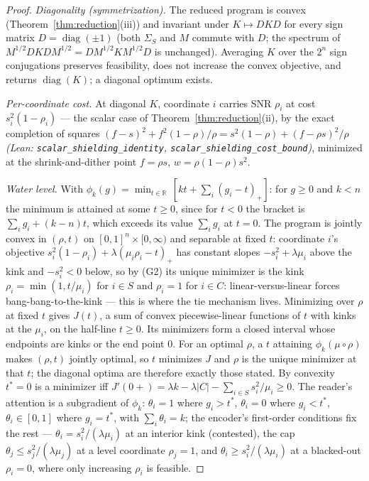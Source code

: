 \documentclass[11pt]{article}
\theoremstyle{definition}
\begin{document}
\begin{proof}
\emph{Diagonality (symmetrization).} The reduced program is convex
(Theorem~\ref{thm:reduction}(iii)) and invariant under $K\mapsto
DKD$ for every sign matrix $D = \operatorname{diag}(\pm1)$ (both
$\Sigma_S$ and $M$ commute with $D$; the spectrum of
$M^{1/2}DKDM^{1/2} = D M^{1/2}KM^{1/2}D$ is unchanged). Averaging
$K$ over the $2^n$ sign conjugations preserves feasibility, does not
increase the convex objective, and returns
$\operatorname{diag}(K)$; a diagonal optimum exists.

\emph{Per-coordinate cost.} At diagonal $K$, coordinate $i$ carries
SNR $\rho_i$ at cost $s_i^2(1-\rho_i)$ --- the scalar case of
Theorem~\ref{thm:reduction}(ii), by the exact completion of squares
$(f-s)^2 + f^2(1-\rho)/\rho = s^2(1-\rho) + (f-\rho s)^2/\rho$
\emph{(Lean: \texttt{scalar\_shielding\_identity},
\texttt{scalar\_shielding\_cost\_bound})}, minimized at the
shrink-and-dither point $f=\rho s$, $w = \rho(1-\rho)s^2$.

\emph{Water level.} With $\phi_k(g) = \min_{t\in\mathbb R}\,[kt +
\sum_i(g_i-t)_+]$: for $g\ge0$ and $k<n$ the minimum is attained at
some $t\ge0$, since for $t<0$ the bracket is $\sum_ig_i+(k-n)t$, which
exceeds its value $\sum_ig_i$ at $t=0$. The program is jointly convex
in $(\rho,t)$ on $[0,1]^n\times[0,\infty)$ and separable at fixed $t$:
coordinate $i$'s objective $s_i^2(1-\rho_i) + \lambda(\mu_i\rho_i -
t)_+$ has constant slopes $-s_i^2 + \lambda\mu_i$ above the kink and
$-s_i^2 < 0$ below, so by (G2) its unique minimizer is the kink
$\rho_i = \min(1, t/\mu_i)$ for $i\in S$ and $\rho_i = 1$ for $i\in C$:
linear-versus-linear forces bang-bang-to-the-kink --- this is where
the tie mechanism lives. Minimizing over $\rho$ at fixed $t$ gives
$J(t)$, a sum of convex piecewise-linear functions of $t$ with kinks at
the $\mu_i$, on the half-line $t\ge0$. Its minimizers form a closed
interval whose endpoints are kinks or the end point $0$. For an optimal
$\rho$, a $t$ attaining $\phi_k(\mu\circ\rho)$ makes $(\rho,t)$ jointly
optimal, so $t$ minimizes $J$ and $\rho$ is the unique minimizer at
that $t$; the diagonal optima are therefore exactly those stated. By
convexity $t^\ast=0$ is a minimizer iff
$J'(0+)=\lambda k-\lambda|C|-\sum_{i\in S}s_i^2/\mu_i\ge0$. The
reader's attention is a subgradient of $\phi_k$: $\theta_i=1$ where
$g_i>t^\ast$, $\theta_i=0$ where $g_i<t^\ast$, $\theta_i\in[0,1]$ where
$g_i=t^\ast$, with $\sum_i\theta_i=k$; the encoder's first-order
conditions fix the rest --- $\theta_i=s_i^2/(\lambda\mu_i)$ at an
interior kink (contested), the cap $\theta_j\le s_j^2/(\lambda\mu_j)$ at
a level coordinate $\rho_j=1$, and $\theta_i\ge s_i^2/(\lambda\mu_i)$
at a blacked-out $\rho_i=0$, where only increasing $\rho_i$ is feasible.


\end{proof}
\end{document}
